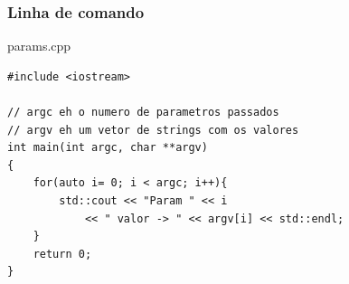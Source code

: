 \documentclass[xcolor={usenames,dvipsnames},10pt,compress,aspectratio=169]{beamer}
\begin{document}
\begin{frame}[fragile]
  \frametitle{Linha de comando}
  \begin{block}{params.cpp}
\begin{lstlisting}
#include <iostream>

// argc eh o numero de parametros passados
// argv eh um vetor de strings com os valores
int main(int argc, char **argv)
{
    for(auto i= 0; i < argc; i++){
        std::cout << "Param " << i
            << " valor -> " << argv[i] << std::endl;
    }
    return 0;
}
\end{lstlisting}
  \end{block}
\end{frame}
\end{document}
